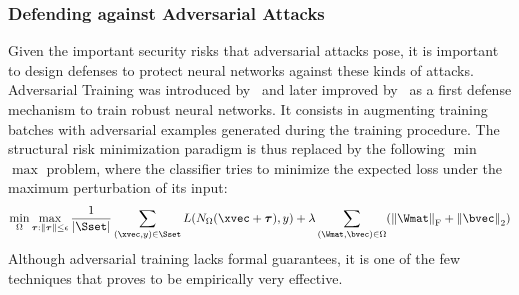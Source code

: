 \subsubsection{Defending against Adversarial Attacks}
\label{subsubsection:ch2-defending_against_adversarial_attacks}

Given the important security risks that adversarial attacks pose, it is important to design defenses to protect neural networks against these kinds of attacks.
Adversarial Training was introduced by~\citet{goodfellow2014explaining} and later improved by~\citet{madry2018towards} as a first defense mechanism to train robust neural networks.
It consists in augmenting training batches with adversarial examples generated during the training procedure.
The structural risk minimization paradigm is thus replaced by the following $\min$ $\max$ problem, where the classifier tries to minimize the expected loss under the maximum perturbation of its input:
\begin{equation}
  \min_\weights \max_{\adv: \norm{\adv} \leq \epsilon} \frac{1}{|\Sset|} \sum_{(\xvec, y) \in \Sset} L\left( \nn_\weights \left(\xvec + \adv \right), y \right) + \lambda \sum_{(\Wmat, \bvec) \in \weights} \left( \norm{\Wmat}_\mathrm{F} + \norm{\bvec}_\mathrm{2} \right)
\end{equation}
Although adversarial training lacks formal guarantees, it is one of the few techniques that proves to be empirically very effective.






%
%
%



